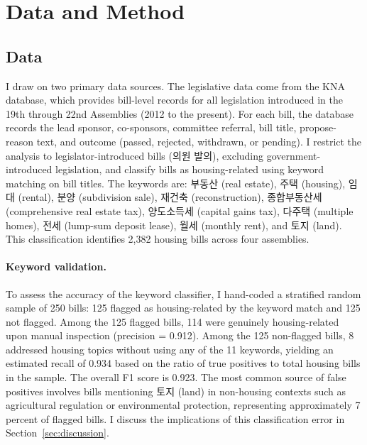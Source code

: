 \documentclass[11pt]{article}
\begin{document}
\section{Data and Method}
\label{sec:data}

\subsection{Data}

I draw on two primary data sources. The legislative data come from the KNA database, which provides bill-level records for all legislation introduced in the 19th through 22nd Assemblies (2012 to the present). For each bill, the database records the lead sponsor, co-sponsors, committee referral, bill title, propose-reason text, and outcome (passed, rejected, withdrawn, or pending). I restrict the analysis to legislator-introduced bills (의원 발의), excluding government-introduced legislation, and classify bills as housing-related using keyword matching on bill titles. The keywords are: 부동산 (real estate), 주택 (housing), 임대 (rental), 분양 (subdivision sale), 재건축 (reconstruction), 종합부동산세 (comprehensive real estate tax), 양도소득세 (capital gains tax), 다주택 (multiple homes), 전세 (lump-sum deposit lease), 월세 (monthly rent), and 토지 (land). This classification identifies 2,382 housing bills across four assemblies.

\paragraph{Keyword validation.} To assess the accuracy of the keyword classifier, I hand-coded a stratified random sample of 250 bills: 125 flagged as housing-related by the keyword match and 125 not flagged. Among the 125 flagged bills, 114 were genuinely housing-related upon manual inspection (precision = 0.912). Among the 125 non-flagged bills, 8 addressed housing topics without using any of the 11 keywords, yielding an estimated recall of 0.934 based on the ratio of true positives to total housing bills in the sample. The overall F1 score is 0.923. The most common source of false positives involves bills mentioning 토지 (land) in non-housing contexts such as agricultural regulation or environmental protection, representing approximately 7 percent of flagged bills. I discuss the implications of this classification error in Section~\ref{sec:discussion}.
\end{document}
